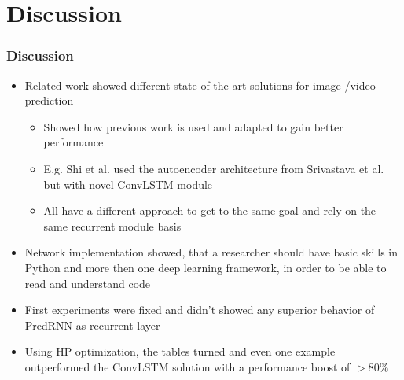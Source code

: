 \section{Discussion} 
 \begin{frame}
  \frametitle{Discussion}
  
  \begin{itemize}
   \item<1-> Related work showed different state-of-the-art solutions for image-/video-prediction
   \begin{itemize}
    \item<2-> Showed how previous work is used and adapted to gain better performance
    \item<3-> E.g. Shi et al. \cite{Shi2015} used the autoencoder architecture from Srivastava et al. \cite{Srivastava2015} but with novel ConvLSTM module
   \end{itemize}
   \begin{itemize}
    \item<4-> All have a different approach to get to the same goal and rely on the same recurrent module basis
   \end{itemize}
   \item<5-> Network implementation showed, that a researcher should have basic skills in Python and more then one deep learning framework,
   in order to be able to read and understand code
   \item<6-> First experiments were fixed and didn't showed any superior behavior of PredRNN as recurrent layer
   \item<7-> Using HP optimization, the tables turned and even one example outperformed the ConvLSTM solution with a performance boost of $>80\%$
  \end{itemize}

 \end{frame}